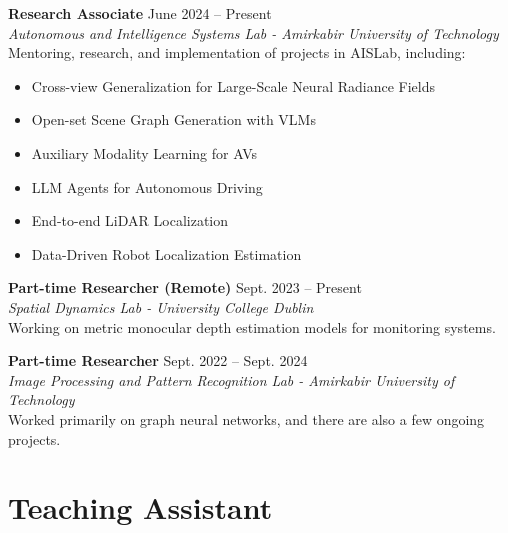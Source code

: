 \documentclass[10pt, letterpaper]{article}
\begin{document}
        \noindent\textbf{Research Associate} \hfill {June 2024 – Present} \\
        \textit{Autonomous and Intelligence Systems Lab - Amirkabir University of Technology} \\
        \noindent Mentoring, research, and implementation of projects in AISLab, including:
        \begin{itemize}[leftmargin=1.2cm, itemsep=-0.1cm]
            \item Cross-view Generalization for Large-Scale Neural Radiance Fields 
            \item Open-set Scene Graph Generation with VLMs 
            \item Auxiliary Modality Learning for AVs 
            \item LLM Agents for Autonomous Driving 
            \item End-to-end LiDAR Localization
            \item Data-Driven Robot Localization Estimation
        \end{itemize}
        
        \noindent\textbf{Part-time Researcher (Remote)} \hfill {Sept. 2023 – Present} \\
        \textit{Spatial Dynamics Lab - University College Dublin} \\
        \noindent Working on metric monocular depth estimation models for monitoring systems. 

        \noindent\textbf{Part-time Researcher} \hfill {Sept. 2022 – Sept. 2024} \\
        \textit{Image Processing and Pattern Recognition Lab - Amirkabir University of Technology} \\
        \noindent Worked primarily on graph neural networks, and there are also a few ongoing projects.
        
    \section*{\textcolor{primaryColor}{Teaching Assistant}}    
\end{document}
